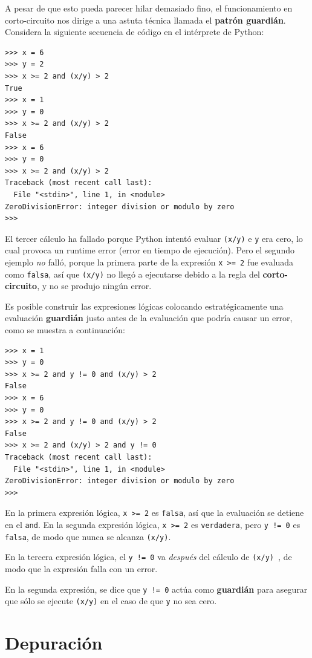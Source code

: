 A pesar de que esto pueda parecer hilar demasiado fino, el funcionamiento
en corto-circuito nos dirige a una astuta técnica llamada el {\bf patrón guardián}.
Considera la siguiente secuencia de código en el intérprete de Python:

\beforeverb
\begin{verbatim}
>>> x = 6 
>>> y = 2
>>> x >= 2 and (x/y) > 2
True
>>> x = 1 
>>> y = 0
>>> x >= 2 and (x/y) > 2
False
>>> x = 6
>>> y = 0
>>> x >= 2 and (x/y) > 2
Traceback (most recent call last):
  File "<stdin>", line 1, in <module>
ZeroDivisionError: integer division or modulo by zero
>>> 
\end{verbatim}
\afterverb
%
El tercer cálculo ha fallado porque Python intentó evaluar {\tt (x/y)}
e {\tt y} era cero, lo cual provoca un runtime error (error en tiempo de ejecución). Pero el segundo
ejemplo \emph{no} falló, porque la primera parte de la expresión {\tt x >= 2}
fue evaluada como {\tt falsa}, así que {\tt (x/y)} no llegó a ejecutarse
debido a la regla del {\bf corto-circuito}, y no se produjo ningún error.

Es posible construir las expresiones lógicas colocando estratégicamente una
evaluación {\bf guardián} justo antes de la evaluación que podría causar un error,
como se muestra a continuación:

\beforeverb
\begin{verbatim}
>>> x = 1
>>> y = 0
>>> x >= 2 and y != 0 and (x/y) > 2
False
>>> x = 6 
>>> y = 0
>>> x >= 2 and y != 0 and (x/y) > 2
False
>>> x >= 2 and (x/y) > 2 and y != 0
Traceback (most recent call last):
  File "<stdin>", line 1, in <module>
ZeroDivisionError: integer division or modulo by zero
>>>
\end{verbatim}
\afterverb
%
En la primera expresión lógica, {\tt x >= 2} es {\tt falsa}, así que la evaluación
se detiene en el {\tt and}. En la segunda expresión lógica, {\tt x >= 2} es {\tt verdadera},
pero {\tt y != 0} es {\tt falsa}, de modo que nunca se alcanza {\tt (x/y)}.

En la tercera expresión lógica, el {\tt y != 0} va \emph{después} del
cálculo de {\tt (x/y) }, de modo que la expresión falla con un error.

En la segunda expresión, se dice que {\tt y != 0} actúa como {\bf guardián}
para asegurar que sólo se ejecute {\tt (x/y)} en el caso de que {\tt y} no sea cero.


\section{Depuración}
\label{whitespace}

